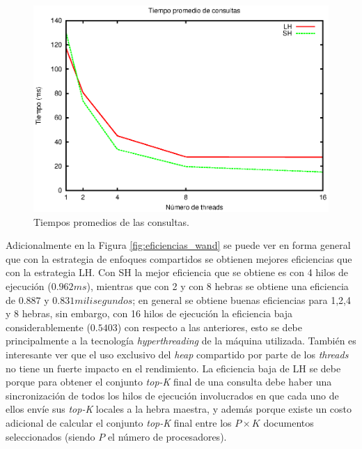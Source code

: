 \begin{figure}[!ht]
\centering
\includegraphics[scale=.75]{images/tiempos_wand.eps}
\caption{Tiempos promedios de las consultas.}
\label{fig:tiempos_wand}
\end{figure}

Adicionalmente en la Figura \ref{fig:eficiencias_wand} se puede ver en forma general que con la estrategia de enfoques compartidos se obtienen mejores eficiencias que con la estrategia LH. Con SH la mejor eficiencia que se obtiene es con 4 hilos de ejecución ($0.962 ms$), mientras que con 2 y con 8 hebras se obtiene una eficiencia de $0.887$ y $0.831 milisegundos$; en general se obtiene buenas eficiencias para 1,2,4 y 8 hebras, sin embargo, con 16 hilos de ejecución la eficiencia baja considerablemente ($0.5403$) con respecto a las anteriores, esto se debe principalmente a la tecnología \textit{hyperthreading} de la máquina utilizada. También es interesante ver que el uso exclusivo del \textit{heap} compartido por parte de los \textit{threads} no tiene un fuerte impacto en el rendimiento. La eficiencia baja de LH se debe porque para obtener el conjunto \textit{top-K} final de una consulta debe haber una sincronización de todos los hilos de ejecución involucrados en que cada uno de ellos envíe sus \textit{top-K} locales a la hebra maestra, y además porque existe un costo adicional de calcular el conjunto \textit{top-K} final entre los $P \times K$ documentos seleccionados (siendo $P$ el número de procesadores). 
                     


